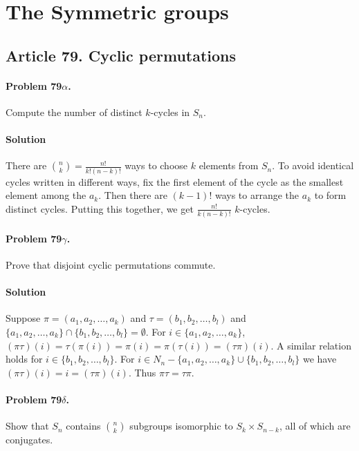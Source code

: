\section{The Symmetric groups}


\subsection{Article 79. Cyclic permutations}

\paragraph{Problem 79$\alpha$.}
Compute the number of distinct $k$-cycles in $S_n$.

\paragraph*{Solution}
There are $\binom{n}{k} = \frac{n!}{k!(n-k)!}$
ways to choose $k$ elements from $S_n$. To avoid identical cycles written in
different ways, fix the first element of the cycle as the smallest element among
the $a_k$. Then there are $(k-1)!$ ways to arrange the $a_k$ to form distinct
cycles. Putting this together, we get $ \frac{n!}{k(n-k)!}$ $k$-cycles.

\paragraph{Problem 79$\gamma$.}
Prove that disjoint cyclic permutations commute.

\paragraph*{Solution}
Suppose $\pi = (a_1, a_2, \dots, a_k)$ and $\tau = (b_1, b_2, \dots, b_l)$ and
$\{ a_1, a_2, \dots, a_k \} \cap \{ b_1, b_2, \dots, b_l \} = \emptyset$.
For $ i \in \{ a_1, a_2, \dots, a_k \} $, $(\pi \tau)(i) = \tau(\pi (i)) =
\pi(i) = \pi(\tau(i)) = (\tau \pi)(i)$. A similar relation holds for $ i \in
\{ b_1, b_2, \dots, b_l \}$. For $i \in N_n - \{ a_1, a_2, \dots, a_k \} \cup
\{ b_1, b_2, \dots, b_l \}$ we have $(\pi \tau)(i) = i = (\tau \pi)(i)$. Thus
$\pi \tau = \tau \pi$.

\paragraph{Problem 79$\delta$.}
Show that $S_n$ contains $\binom{n}{k}$
subgroups isomorphic to $S_k \times S_{n-k}$, all of which are conjugates.


